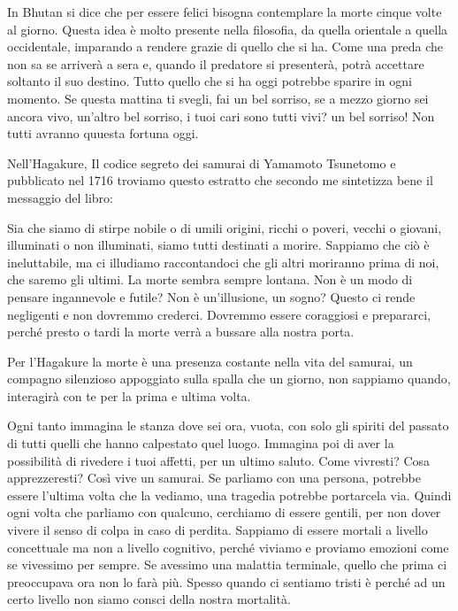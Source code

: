 \documentclass[12pt]{book} %
\begin{document}
In Bhutan si dice che per essere felici bisogna contemplare la morte cinque volte al giorno. Questa idea è molto
presente nella filosofia, da quella orientale a quella occidentale, imparando a rendere grazie di quello che si ha.
Come una preda che non sa se arriverà a sera e, quando il predatore si presenterà, potrà accettare soltanto il suo
destino. Tutto quello che si ha oggi potrebbe sparire in ogni momento. 
Se questa mattina ti svegli, fai un bel sorriso, se a mezzo giorno sei ancora vivo, un'altro bel sorriso, i tuoi cari sono tutti vivi? un bel sorriso! Non tutti avranno quuesta fortuna oggi.

Nell'Hagakure, Il codice segreto dei samurai di Yamamoto Tsunetomo e pubblicato nel
1716 troviamo questo
estratto che secondo me sintetizza bene il messaggio del libro:

Sia che siamo di stirpe nobile o di umili origini, ricchi o poveri, vecchi o giovani, illuminati o non illuminati, siamo
tutti destinati a morire. Sappiamo che ciò è ineluttabile, ma ci illudiamo raccontandoci che gli altri moriranno prima
di noi, che saremo gli ultimi. La morte sembra sempre lontana. Non è un modo di pensare ingannevole e futile? Non è
un'illusione, un sogno? Questo ci rende negligenti e non dovremmo crederci. Dovremmo essere coraggiosi e prepararci,
perché presto o tardi la morte verrà a bussare alla nostra porta.

Per l'Hagakure la morte è una presenza costante nella vita del samurai, un compagno silenzioso
appoggiato sulla spalla che un giorno, non sappiamo quando, interagirà con te per la prima e ultima volta. 

Ogni tanto immagina le stanza dove sei ora, vuota, con solo gli spiriti del passato di tutti quelli che hanno calpestato quel luogo. 
Immagina poi di aver la possibilità di rivedere i tuoi affetti, per un ultimo saluto. Come vivresti? Cosa apprezzeresti?
Così vive un samurai. Se parliamo con una persona, potrebbe essere l'ultima volta che la vediamo, una tragedia potrebbe
portarcela via. Quindi ogni volta che parliamo con qualcuno, cerchiamo di essere gentili, per non dover vivere il
senso di colpa in caso di perdita.
Sappiamo di essere mortali a livello concettuale ma non a livello cognitivo, perché viviamo e proviamo emozioni come se
vivessimo per sempre. Se avessimo una malattia terminale, quello che prima ci preoccupava ora non lo farà più. Spesso
quando ci sentiamo tristi è perché ad un certo livello non siamo consci della nostra mortalità.
\end{document}
